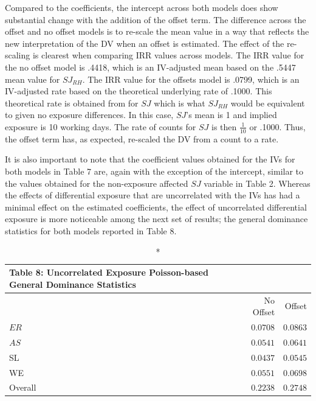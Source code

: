 \documentclass[ShortAfour,times,sageapa]{sagej}
\begin{document}
	Compared to the coefficients, the intercept across both models does show substantial change with the addition of the offset term.
	The difference across the offset and no offset models is to re-scale the mean value in a way that reflects the new interpretation of the DV when an offset is estimated.
	The effect of the re-scaling is clearest when comparing IRR values across models.
	The IRR value for the no offset model is .4418, which is an IV-adjusted mean based on the .5447 mean value for $SJ_{RH}$.
	The IRR value for the offsets model is .0799, which is an IV-adjusted rate based on the theoretical underlying rate of .1000.
	This theoretical rate is obtained from for $SJ$ which is what $SJ_{RH}$ would be equivalent to given no exposure differences.
	In this case, $SJ$'s mean is 1 and implied exposure is 10 working days.
	The rate of counts for $SJ$ is then $\frac{1}{10}$ or .1000.
	Thus, the offset term has, as expected, re-scaled the DV from a count to a rate.
	
	It is also important to note that the coefficient values obtained for the IVs for both models in Table 7 are, again with the exception of the intercept, similar to the values obtained for the non-exposure affected $SJ$ variable in Table 2.
	Whereas the effects of differential exposure that are uncorrelated with the IVs has had a minimal effect on the estimated coefficients, the effect of uncorrelated differential exposure is more noticeable among the next set of results; the general dominance statistics for both models reported in Table 8.
	
	\begin{longtable}{l|rr}
		\caption*{
			{\large Table 8: Uncorrelated Exposure Poisson-based General Dominance Statistics}
		} \\ 
		\toprule
		\multicolumn{1}{l}{} & No Offset & Offset \\ 
		\midrule
		$ER$ & $0.0708$ & $0.0863$ \\ 
		$AS$ & $0.0541$ & $0.0641$ \\ 
		SL & $0.0437$ & $0.0545$ \\ 
		WE & $0.0551$ & $0.0698$ \\ 
		\midrule
		Overall & $0.2238$ & $0.2748$ \\ 
		\bottomrule
	\end{longtable}
	
\end{document}
